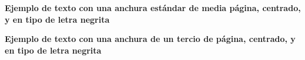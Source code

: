 \documentclass{article}
\begin{document}
\newenvironment{mientorno}[1][0.5]
  {\begin{center}\begin{minipage}{#1\textwidth}\bfseries}
  {\end{minipage}\end{center}}

\iffalse
Las definiciones de entrada son los comandos que se ejecutan el entrar
al entorno y las definiciones de salida son los que se ejecutan al salir.
\fi

\begin{mientorno}
Ejemplo de texto con una anchura estándar de media página, centrado,
y en tipo de letra negrita
\end{mientorno}

\begin{mientorno}[0.3]  %
Ejemplo de texto con una anchura de un tercio de página, centrado, y
en tipo de letra negrita
\end{mientorno}

\end{document}

